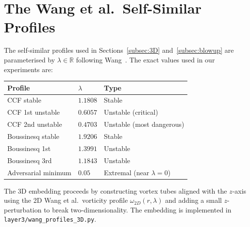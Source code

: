 \documentclass[12pt]{article}
\theoremstyle{definition}
\newcommand{\R}{\mathbb{R}}
\begin{document}
\section{The Wang et al.\ Self-Similar Profiles}
\label{app:wang}

The self-similar profiles used in Sections~\ref{subsec:3D} and~\ref{subsec:blowup}
are parameterised by $\lambda \in \R$ following Wang~\cite{Wang2025}. The
exact values used in our experiments are:

\begin{center}
\renewcommand{\arraystretch}{1.2}
\begin{tabular}{@{}lll@{}}
\toprule
Profile & $\lambda$ & Type \\
\midrule
CCF stable & $1.1808$ & Stable \\
CCF 1st unstable & $0.6057$ & Unstable (critical) \\
CCF 2nd unstable & $0.4703$ & Unstable (most dangerous) \\
Boussinesq stable & $1.9206$ & Stable \\
Boussinesq 1st & $1.3991$ & Unstable \\
Boussinesq 3rd & $1.1843$ & Unstable \\
Adversarial minimum & $0.05$ & Extremal (near $\lambda = 0$) \\
\bottomrule
\end{tabular}
\end{center}

The 3D embedding proceeds by constructing vortex tubes aligned with the $z$-axis
using the 2D Wang et al.\ vorticity profile $\omega_{2D}(r, \lambda)$ and
adding a small $z$-perturbation to break two-dimensionality.
The embedding is implemented in \texttt{layer3/wang\_profiles\_3D.py}.
\end{document}
